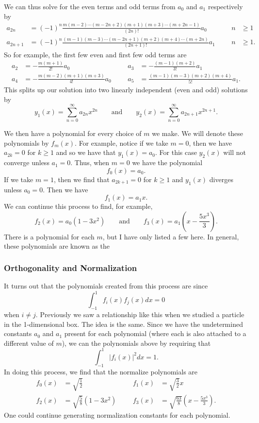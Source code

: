 We can thus solve for the even terms and odd terms from $a_0$ and $a_1$ respectively by
\begin{align*}
    a_{2n} &= (-1)^n \frac{m(m-2)\cdots (m-2n+2)(m+1)(m+3)\cdots (m+2n-1)}{(2n)!}a_0 &&& n&\geq 1\\
    a_{2n+1} &= (-1)^n \frac{(m-1)(m-3)\cdots(m-2n+1)(m+2)(m+4)\cdots (m+2n)}{(2n+1)!}a_1 &&& n&\geq 1.
\end{align*}
So for example, the first few even and first few odd terms are
\begin{align*}
    a_2 &= -\frac{m(m+1)}{2!}a_0 &&& a_3 &= -\frac{(m-1)(m+2)}{3!}a_1\\
    a_4 &= -\frac{m(m-2)(m+1)(m+3)}{4!} a_0 &&& a_5 &= \frac{(m-1)(m-3)(m+2)(m+4)}{5!}a_1.
\end{align*}
This splits up our solution into two linearly independent (even and odd) solutions by
\[
y_1(x)=\sum_{n=0}^\infty a_{2n}x^{2n} \qquad \textrm{and} \qquad y_2(x)=\sum_{n=0}^\infty a_{2n+1}x^{2n+1}.
\]

We then have a polynomial for every choice of $m$ we make.  We will denote these polynomials by $f_m(x)$. For example, notice if we take $m=0$, then we have $a_{2k}=0$ for $k\geq 1$ and so we have that $y_1(x)=a_0$. For this case $y_2(x)$ will not converge unless $a_1=0$.  Thus, when $m=0$ we have the polynomial
\[
f_0(x) = a_0.
\]
If we take $m=1$, then we find that $a_{2k+1}=0$ for $k\geq 1$ and $y_1(x)$ diverges unless $a_0=0$.  Then we have
\[
f_1(x)= a_1 x.
\]
We can continue this process to find, for example,
\[
f_2(x)=a_0(1-3x^2) \qquad \textrm{and} \qquad f_3(x) = a_1\left( x - \frac{5x^3}{3}\right).
\]
There is a polynomial for each $m$, but I have only listed a few here. In general, these polynomials are known as the  

\subsubsection{Orthogonality and Normalization}
It turns out that the polynomials created from this process are  since
\[
\int_{-1}^1 f_i(x)f_j(x)dx = 0
\]
when $i\neq j$.  Previously we saw a relationship like this when we studied a particle in the 1-dimensional box.  The idea is the same.  Since we have the undetermined constants $a_0$ and $a_1$ present for each polynomial (where each is also attached to a different value of $m$), we can  the polynomials above by requiring that
\[
\int_{-1}^1 |f_i(x)|^2 dx = 1.
\]
In doing this process, we find that the normalize polynomials are
\begin{align*}
    f_0(x)&=\sqrt{\frac{1}{2}} &&& f_1(x)&=\sqrt{\frac{3}{2}} x\\
    f_2(x)&= \sqrt{\frac{5}{8}}(1-3x^2) &&& f_3(x)&=\sqrt{\frac{63}{8}}\left( x -\frac{5x^3}{3}\right).
\end{align*}
One could continue generating normalization constants for each polynomial.


